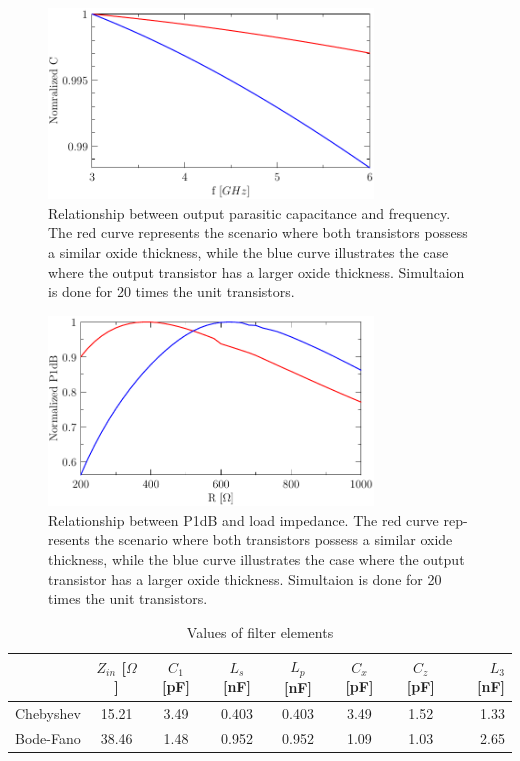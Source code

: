 \documentclass[lettersize,journal]{IEEEtran}
\begin{document}
\begin{figure}[!t]
\centering
\includegraphics[width=3.4in]{./fig/Cd.pdf}
\caption{Relationship between output parasitic capacitance and frequency. The
red curve represents the scenario where both transistors possess a similar
oxide thickness, while the blue curve illustrates the case where the output
transistor has a larger oxide thickness. Simultaion is done for 20 times the
unit transistors.}
\label{fig:Cd}
\end{figure}

\begin{figure}[!t]
\centering
\includegraphics[width=3.4in]{./fig/Zopt.pdf}
\caption{Relationship between P1dB and load impedance. The red curve rep-
resents the scenario where both transistors possess a similar oxide thickness,
while the blue curve illustrates the case where the output transistor has a
larger oxide thickness. Simultaion is done for 20 times the unit transistors.}
\label{fig:Zopt}
\end{figure}

\begin{table}[b!]
\caption{Values of filter elements}

\footnotesize
  \begin{tabular}{ | l | c | c | c | c | c | c | r |}
    \hline
     & $Z_{in}$ [$\Omega$] & $C_1$ [pF] & $L_s$ [nF] & $L_p$ [nF] & $C_x$ [pF] & $C_z$ [pF] & $L_3$ [nF] \\ \hline
    Chebyshev & 15.21 & 3.49 & 0.403 & 0.403 & 3.49 & 1.52 & 1.33 \\ \hline
    Bode-Fano & 38.46 & 1.48 & 0.952 & 0.952 & 1.09 & 1.03 & 2.65 \\ \hline
  \end{tabular}
  \label{tab:all_elements}
\end{table}
\end{document}
